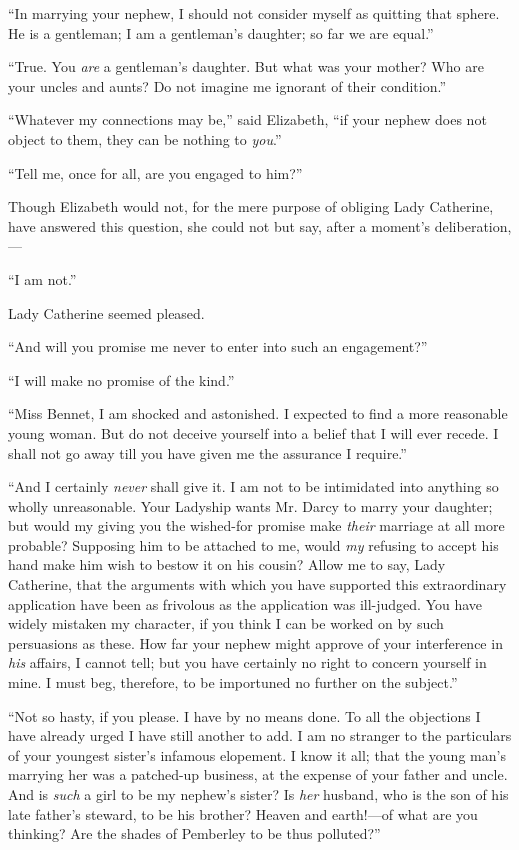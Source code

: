 \documentclass[12pt]{book}
\begin{document}
``In marrying your nephew, I should not consider myself as quitting that sphere. He is a gentleman; I am a gentleman's daughter; so far we are equal.''

``True. You \textit{are} a gentleman's daughter. But what was your mother? Who are your uncles and aunts? Do not imagine me ignorant of their condition.''

``Whatever my connections may be,'' said Elizabeth, ``if your nephew does not object to them, they can be nothing to \textit{you}.''

``Tell me, once for all, are you engaged to him?''

Though Elizabeth would not, for the mere purpose of obliging Lady Catherine, have answered this question, she could not but say, after a moment's deliberation,---

``I am not.''

Lady Catherine seemed pleased.

``And will you promise me never to enter into such an engagement?''

``I will make no promise of the kind.''

``Miss Bennet, I am shocked and astonished. I expected to find a more reasonable young woman. But do not deceive yourself into a belief that I will ever recede. I shall not go away till you have given me the assurance I require.''

``And I certainly \textit{never} shall give it. I am not to be intimidated into anything so wholly unreasonable. Your Ladyship wants Mr. Darcy to marry your daughter; but would my giving you the wished-for promise make \textit{their} marriage at all more probable? Supposing him to be attached to me, would \textit{my} refusing to accept his hand make him wish to bestow it on his cousin? Allow me to say, Lady Catherine, that the arguments with which you have supported this extraordinary application have been as frivolous as the application was ill-judged. You have widely mistaken my character, if you think I can be worked on by such persuasions as these. How far your nephew might approve of your interference in \textit{his} affairs, I cannot tell; but you have certainly no right to concern yourself in mine. I must beg, therefore, to be importuned no further on the subject.''

``Not so hasty, if you please. I have by no means done. To all the objections I have already urged I have still another to add. I am no stranger to the particulars of your youngest sister's infamous elopement. I know it all; that the young man's marrying her was a patched-up business, at the expense of your father and uncle. And is \textit{such} a girl to be my nephew's sister? Is \textit{her} husband, who is the son of his late father's steward, to be his brother? Heaven and earth!---of what are you thinking? Are the shades of Pemberley to be thus polluted?''
\end{document}
